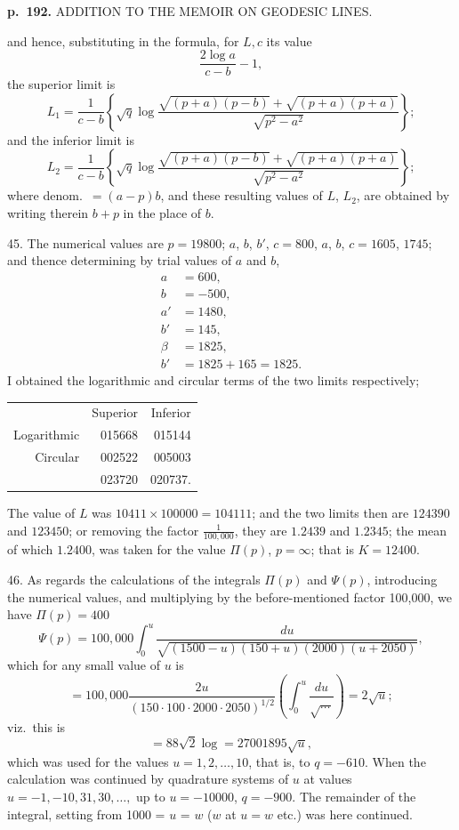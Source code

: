 \documentclass[11pt,a4paper]{book}
\begin{document}
\clearpage

\noindent
\textbf{p.~192.}  ADDITION TO THE MEMOIR ON GEODESIC LINES.

and hence, substituting in the formula, for $L,c$ its value
\[
\frac{2 \log a}{c - b} - 1,
\]
the superior limit is
\[
L_1 = \frac{1}{c - b}\left\{\sqrt{q}\log\frac{\sqrt{(p + a)(p - b)} + \sqrt{(p + a)(p + a)}}{\sqrt{p^2 - a^2}}\right\};
\]
and the inferior limit is
\[
L_2 = \frac{1}{c - b}\left\{\sqrt{q}\log\frac{\sqrt{(p + a)(p - b)} + \sqrt{(p + a)(p + a)}}{\sqrt{p^2 - a^2}}\right\};
\]
where denom.\ $= (a - p)b$, and these resulting values of $L$, $L_2$, are obtained by writing therein $b + p$ in the place of $b$.

45. The numerical values are $p = 19800$; $a$, $b$, $b'$, $c = 800$, $a$, $b$, $c = 1605$, $1745$; and thence determining by trial values of $a$ and $b$,
\begin{align*}
a &= 600, \\
b &= -500, \\
a' &= 1480, \\
b' &= 145, \\
\beta &= 1825, \\
b' &= 1825 + 165 = 1825.
\end{align*}
I obtained the logarithmic and circular terms of the two limits respectively;
\begin{center}
\begin{tabular}{rrr}
& Superior & Inferior \\
Logarithmic & 015668 & 015144 \\
Circular & 002522 & 005003 \\
& 023720 & 020737.
\end{tabular}
\end{center}

The value of $L$ was $10411 \times 100000 = 104111$; and the two limits then are $124390$ and $123450$; or removing the factor $\frac{1}{100,000}$, they are $1.2439$ and $1.2345$; the mean of which $1.2400$, was taken for the value $\Pi(p)$, $p = \infty$; that is $K = 12400$.

46. As regards the calculations of the integrals $\Pi(p)$ and $\Psi(p)$, introducing the numerical values, and multiplying by the before-mentioned factor 100,000, we have
$\Pi(p) = 400$
\[
\Psi(p) = 100,000 \int_{0}^{u} \frac{du}{\sqrt{(1500 - u)(150 + u)(2000)(u + 2050)}},
\]
which for any small value of $u$ is
\[
= 100,000 \frac{2u}{(150 \cdot 100 \cdot 2000 \cdot 2050)^{1/2}}\left(\int_0^{u}\frac{du}{\sqrt{\ldots}}\right) = 2\sqrt{u};
\]
viz.\ this is
\[
= 88\sqrt{2} \log = 27001895\sqrt{u},
\]
which was used for the values $u = 1, 2, \ldots, 10$, that is, to $q = -610$.  When the calculation was continued by quadrature systems of $u$ at values $u = -1, -10, 31, 30, \ldots, $ up to $u = -10000$, $q = -900$.  The remainder of the integral, setting from 1000 = $u$ = $w$ ($w$ at $u = w$ etc.) was here continued.
\end{document}
